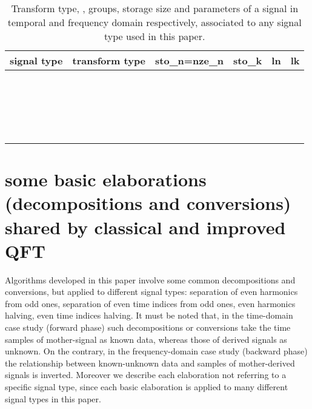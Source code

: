 \documentclass[a4paper,10pt]{article}
\begin{document}
\begin{table}[tb]
\caption{Transform type, ,  groups, storage size  and  parameters of a signal in temporal and frequency domain respectively, associated to any signal type used in this paper.}
\label{tab:notation}
\centering
\scalebox{0.8}
{
\begin{tabular}{cccccc}
\toprule
signal type & transform type & sto\_n=nze\_n & sto\_k & ln & lk\\
\midrule
 &  &  &  &  &  \\
 &  &  &   &  &  \\
 &  &  &   &  &  \\
 &  &  &   &  &  \\
 &  &  &   &  &  \\
 &  &  &   &  &  \\
 &  &  &   &  &  \\
 &  &  &  &  & \\
 &  &  &  &  & \\
 &  &  &  &  & \\
 &  &  &  &  & \\
 &  &  &  &  & \\
 &  &  &  &  & \\
 &  &  &  &  & \\
 &  &  &  &  & \\
 &  &  &  &  & \\
 &  &  &  &  & \\
 &  &   &  &  & \\
 &   &  &  &  & \\
 &   &  &  &  & \\
\bottomrule
\end{tabular}
}
\end{table}






\section{some basic elaborations (decompositions and conversions) shared by classical and improved QFT} \label{sec:conversions}

Algorithms developed in this paper involve some common decompositions and conversions, but applied to different signal types: separation of even harmonics from odd ones, separation of even time indices from odd ones, even harmonics halving, even time indices halving. 
It must be noted that, in the time-domain case study (forward phase) such decompositions  or conversions take the time samples of mother-signal as known data, whereas those of derived signals as unknown. 
On the contrary, in the frequency-domain case study (backward phase) the relationship between known-unknown data and samples of mother-derived signals is inverted.
Moreover we describe each elaboration not referring to a specific signal type, since each basic elaboration is applied to many different signal types in this paper.
\end{document}
